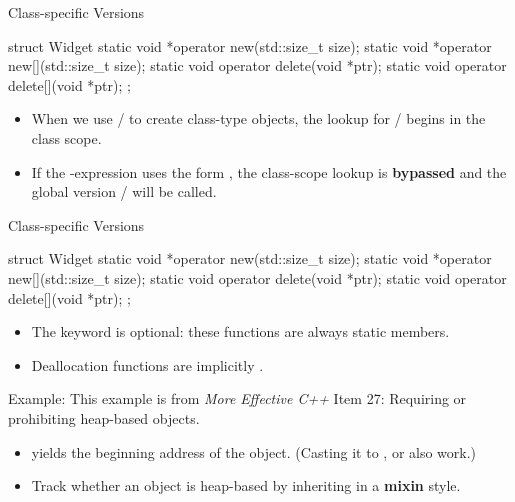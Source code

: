 \documentclass{beamer}
\begin{document}
\begin{frame}[fragile]{Class-specific Versions}
  \begin{cpp}[\small]
struct Widget {
  static void *operator new(std::size_t size);
  static void *operator new[](std::size_t size);
  static void operator delete(void *ptr);
  static void operator delete[](void *ptr);
};
  \end{cpp}
  \begin{itemize}
    \item When we use / to create class-type objects, the lookup for / begins in the class scope.
    \item If the -expression uses the form , the class-scope lookup is \textbf{bypassed} and the global version / will be called.
  \end{itemize}
\end{frame}

\begin{frame}[fragile]{Class-specific Versions}
  \begin{cpp}[\small]
struct Widget {
  static void *operator new(std::size_t size);
  static void *operator new[](std::size_t size);
  static void operator delete(void *ptr);
  static void operator delete[](void *ptr);
};
  \end{cpp}
  \begin{itemize}
    \item The keyword  is optional: these functions are always static members.
    \item Deallocation functions are implicitly .
  \end{itemize}
\end{frame}

\begin{frame}[fragile]{Example: }
  This example is from \textit{More Effective C++} Item 27: Requiring or prohibiting heap-based objects.
  \begin{itemize}
    \item {} yields the beginning address of the object. (Casting it to ,  or  also work.)
    \item Track whether an object is heap-based by inheriting  in a \textbf{mixin} style.
  \end{itemize}
\end{frame}
\end{document}
